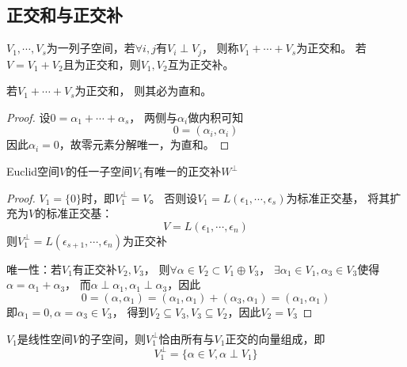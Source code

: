 \subsection{正交和与正交补}

\begin{definition}
  $V_1,\cdots,V_s$为一列子空间，若$\forall i,j $有$V_i \perp V_j$，
  则称$V_1 + \cdots + V_s$为正交和。
  若$V = V_1 + V_2$且为正交和，则$V_1,V_2$互为正交补。
\end{definition}

\begin{theorem}[正交和必为直和]
  若$V_1 + \cdots + V_s$为正交和，
  则其必为直和。
\end{theorem}

\begin{proof}
  设$0 = \alpha_1 + \cdots + \alpha_s$，
  两侧与$\alpha_i$做内积可知
  \begin{equation*}
    0 = (\alpha_i,\alpha_i)
  \end{equation*}
  因此$\alpha_i = 0$，故零元素分解唯一，为直和。
\end{proof}

\begin{theorem}[正交补的唯一性]
  Euclid空间$V$的任一子空间$V_1$有唯一的正交补$W^{\perp}$
\end{theorem}

\begin{proof}
  $V_1 = \{0\}$时，即$V_1^{\perp} = V$。
  否则设$V_1 = L(\epsilon_1,\cdots,\epsilon_s)$为标准正交基，
  将其扩充为$V$的标准正交基：
  \begin{equation*}
    V = L(\epsilon_1,\cdots,\epsilon_n)
  \end{equation*}
  则$V_1^{\perp} = L(\epsilon_{s+1},\cdots,\epsilon_n)$为正交补

  唯一性：若$V_1$有正交补$V_2,V_3$，
  则$\forall \alpha \in V_2 \subset V_1 \oplus V_3$，
  $\exists \alpha_1 \in V_1, \alpha_3 \in V_3$使得$\alpha = \alpha_1 + \alpha_3$，
  而$\alpha \perp \alpha_1, \alpha_1 \perp \alpha_3$，因此
  \begin{equation*}
    0 = (\alpha,\alpha_1 )= (\alpha_1,\alpha_1) + (\alpha_3,\alpha_1) = (\alpha_1,\alpha_1)
  \end{equation*}
  即$\alpha_1 = 0, \alpha = \alpha_3 \in V_3$，
  得到$V_2 \subseteq V_3, V_3 \subseteq V_2$，因此$V_2 = V_3$
\end{proof}

\begin{theorem}[正交补的具体表达式]
  $V_1$是线性空间$V$的子空间，则$V_1^{\perp}$恰由所有与$V_1$正交的向量组成，即
  \begin{equation*}
    V_1^{\perp} = \{\alpha \in V, \alpha \perp V_1\}
  \end{equation*}
\end{theorem}

